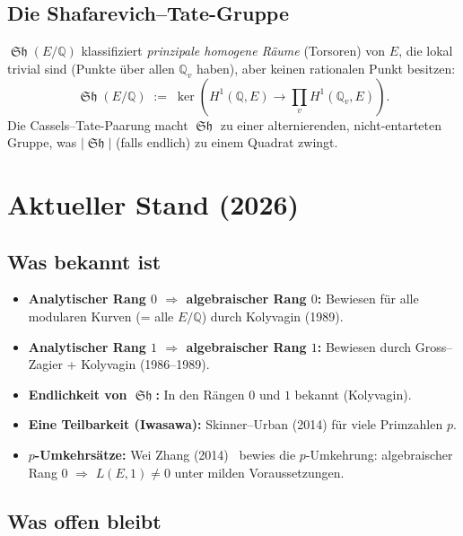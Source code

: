 \documentclass[12pt,a4paper]{article}
\theoremstyle{remark}
\DeclareMathOperator{\Sha}{\mathfrak{Sh}}
\begin{document}
\subsection{Die Shafarevich--Tate-Gruppe}

$\Sha(E/\mathbb{Q})$ klassifiziert \emph{prinzipale homogene Räume} (Torsoren) von $E$,
die lokal trivial sind (Punkte über allen $\mathbb{Q}_v$ haben), aber keinen rationalen Punkt
besitzen:
\[
  \Sha(E/\mathbb{Q}) \;:=\; \ker\!\left(H^1(\mathbb{Q}, E) \to \prod_v H^1(\mathbb{Q}_v, E)\right).
\]
Die Cassels--Tate-Paarung macht $\Sha$ zu einer alternierenden, nicht-entarteten Gruppe,
was $|\Sha|$ (falls endlich) zu einem Quadrat zwingt.

\section{Aktueller Stand (2026)}

\subsection{Was bekannt ist}

\begin{itemize}[nosep]
  \item \textbf{Analytischer Rang $0$ $\Rightarrow$ algebraischer Rang $0$:} Bewiesen für
    alle modularen Kurven (= alle $E/\mathbb{Q}$) durch Kolyvagin (1989).
  \item \textbf{Analytischer Rang $1$ $\Rightarrow$ algebraischer Rang $1$:} Bewiesen durch
    Gross--Zagier + Kolyvagin (1986--1989).
  \item \textbf{Endlichkeit von $\Sha$:} In den Rängen $0$ und $1$ bekannt (Kolyvagin).
  \item \textbf{Eine Teilbarkeit (Iwasawa):} Skinner--Urban (2014) für viele Primzahlen $p$.
  \item \textbf{$p$-Umkehrsätze:} Wei Zhang (2014)~\cite{WeiZhang2014} bewies die
    $p$-Umkehrung: algebraischer Rang $0$ $\Rightarrow$ $L(E,1) \neq 0$ unter milden
    Voraussetzungen.
\end{itemize}

\subsection{Was offen bleibt}
\end{document}
